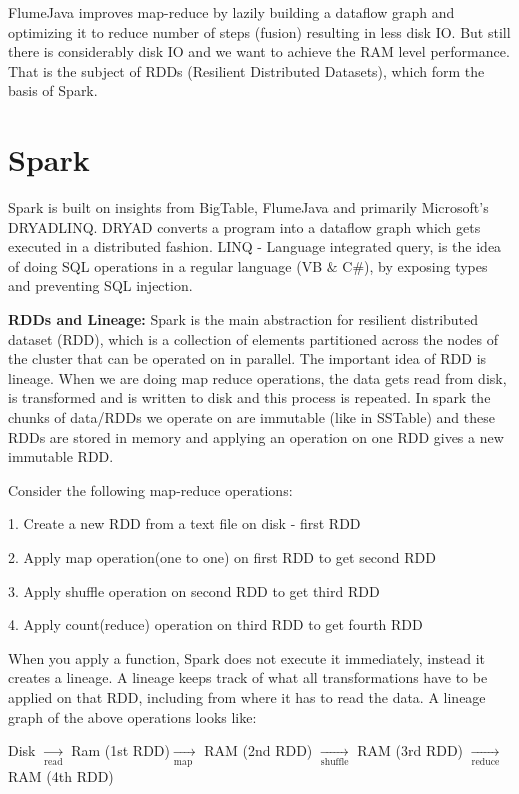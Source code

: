 \documentclass[twoside]{article}
\begin{document}
FlumeJava improves map-reduce by lazily building a dataflow graph and optimizing it to reduce number of steps (fusion) resulting in less disk IO. But still there is considerably disk IO and we want to achieve the RAM level performance. That is the subject of RDDs (Resilient Distributed Datasets), which form the basis of Spark.

\section{Spark}
Spark is built on insights from BigTable, FlumeJava and primarily Microsoft's DRYADLINQ. DRYAD converts a program into a dataflow graph which gets executed in a distributed fashion. LINQ - Language integrated query, is the idea of doing SQL operations in a regular language (VB $\&$ C$\#$), by exposing types and preventing SQL injection. \newline

\textbf{RDDs and Lineage:}\newline
Spark is the main abstraction for resilient distributed dataset (RDD), which is a collection of elements partitioned across the nodes of the cluster that can be operated on in parallel. The important idea of RDD is lineage. When we are doing map reduce operations, the data gets read from disk, is transformed and is written to disk and this process is repeated. In spark the chunks of data/RDDs we operate on are immutable (like in SSTable) and these RDDs are stored in memory and applying an operation on one RDD gives a new immutable RDD. 

Consider the following map-reduce operations:

1. Create a new RDD from a text file on disk - first RDD

2. Apply map operation(one to one) on first RDD to get second RDD

3. Apply shuffle operation on second RDD to get third RDD

4. Apply count(reduce) operation on third RDD to get fourth RDD

When you apply a function, Spark does not execute it immediately, instead it creates a lineage. A lineage keeps track of what all transformations have to be applied on that RDD, including from where it has to read the data. A lineage graph of the above operations looks like:

Disk $\xrightarrow[\text{read}]{}$ Ram (1st RDD)$\xrightarrow[\text{map }]{}$ RAM  (2nd RDD) $\xrightarrow[\text{shuffle}]{}$ RAM  (3rd RDD) $\xrightarrow[\text{reduce}]{}$ RAM  (4th RDD)
\end{document}
